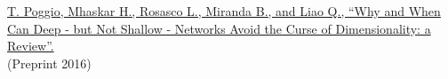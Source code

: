 \documentclass{article}
\newenvironment{changemargin}[2]{%
  \begin{list}{}{%
    \setlength{\topsep}{0pt}%
    \setlength{\leftmargin}{#1}%
    \setlength{\rightmargin}{#2}%
    \setlength{\listparindent}{\parindent}%
    \setlength{\itemindent}{\parindent}%
    \setlength{\parsep}{\parskip}%
  }%
  \item[]}{\end{list}
}
\newenvironment{body} {
	\vspace*{-16pt}
	\begin{changemargin}{-0.25in}{-0.5in}
  }	
	{\end{changemargin}
}
\begin{document}
\begin{body}
    \vspace{10pt}
    \href{https://dspace.mit.edu/handle/1721.1/105443}
    {T. Poggio, Mhaskar H., Rosasco L., Miranda B., and Liao Q., “Why and When Can Deep - but Not Shallow - Networks Avoid the Curse of Dimensionality: a Review”.}
    \\
    (Preprint 2016)
    
    
    
    
    
    \vspace{4pt}
\end{body}

\newpage

\end{document}
